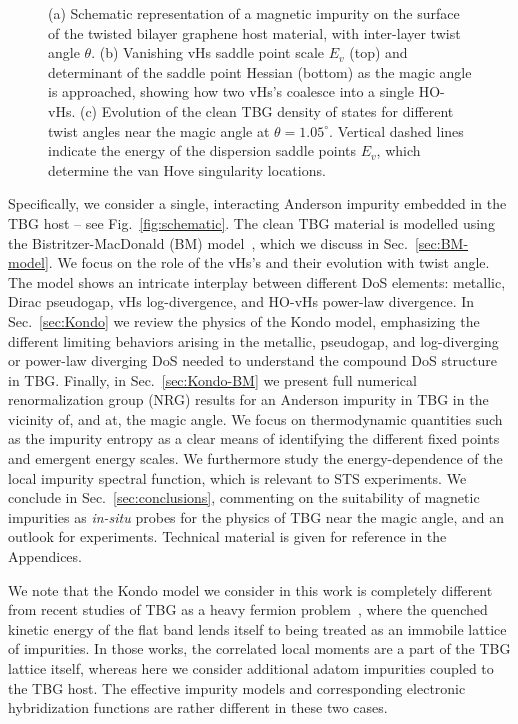 \begin{figure}[t!]
\begin{subfigure}[b]{\linewidth}
		\caption{\centering{\label{fig:HistogramDOS}}}
	\end{subfigure}
	\caption{ %
		  (a) Schematic representation of a magnetic impurity on the surface of the twisted bilayer graphene host material, with inter-layer twist angle $\theta$.   (b) Vanishing vHs saddle point scale $E_v$ (top) and determinant of the saddle point Hessian (bottom) as the magic angle is approached, showing how two vHs's coalesce into a single HO-vHs. 
     (c) Evolution of the clean TBG density of states for different twist angles near the magic angle at $\theta = 1.05^{\circ}$. Vertical dashed lines indicate the energy of the dispersion saddle points $E_v$, which determine the van Hove singularity locations.}
	\label{fig:joinedfig}
\end{figure}

Specifically, we consider a single, interacting Anderson impurity embedded in the TBG host -- see Fig.~\ref{fig:schematic}. The clean TBG material is modelled using the Bistritzer-MacDonald (BM) model~\cite{Bistritzer2011}, which we discuss in Sec.~\ref{sec:BM-model}. We focus on the role of the vHs's and their evolution with twist angle. The model shows an intricate interplay between different DoS elements: metallic, Dirac pseudogap, vHs log-divergence, and HO-vHs power-law divergence. In Sec.~\ref{sec:Kondo} we review the physics of the Kondo model, emphasizing the different limiting behaviors arising in the metallic, pseudogap, and log-diverging or power-law diverging DoS needed to understand the compound DoS structure in TBG. Finally, in Sec.~\ref{sec:Kondo-BM} we present full numerical renormalization group (NRG) results for an Anderson impurity in TBG in the vicinity of, and at, the magic angle. We focus on thermodynamic quantities such as the impurity entropy as a clear means of identifying the different fixed points and emergent energy scales. We furthermore study the energy-dependence of the local impurity spectral function, which is relevant to STS experiments. We conclude in Sec.~\ref{sec:conclusions}, commenting on the suitability of magnetic impurities as \textit{in-situ} probes for the physics of TBG near the magic angle, and an outlook for experiments. Technical material is given for reference in the Appendices. 

We note that the Kondo model we consider in this work is completely different from recent studies of TBG as a heavy fermion problem~\cite{song2022magic,hu2023kondo,hu2023symmetric,zhou2023kondo}, where the quenched kinetic energy of the flat band lends itself to being treated as an immobile lattice of impurities. In those works, the correlated local moments are a part of the TBG lattice itself, whereas here we consider additional adatom impurities coupled to the TBG host. The effective impurity models and corresponding electronic hybridization functions are rather different in these two cases.


